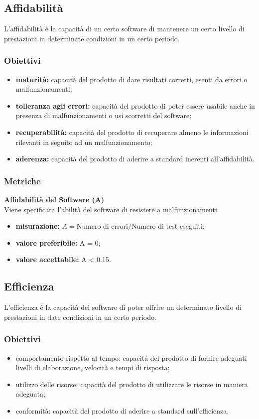 \subsection{Affidabilità}
L'affidabilità è la capacità di un certo software di mantenere un certo livello di prestazioni in determinate condizioni in un certo periodo.
\subsubsection{Obiettivi}
\begin{itemize}
	\item \textbf{maturità:} capacità del prodotto di dare risultati corretti, esenti da errori o malfunzionamenti;
	\item \textbf{tolleranza agli errori:} capacità del prodotto di poter essere usabile anche in presenza di malfunzionamenti o usi scorretti del software;
	\item \textbf{recuperabilità:} capacità del prodotto di recuperare almeno le informazioni rilevanti in seguito ad un malfunzionamento;
	\item \textbf{aderenza:} capacità del prodotto di aderire a standard inerenti all'affidabilità.
\end{itemize}
\subsubsection{Metriche}
\textbf{Affidabilità del Software (A)}\\
Viene specificata l'abilità del software di resistere a malfunzionamenti.
\begin{itemize}
	\item \textbf{misurazione:} $A = $Numero di errori$ / $Numero di test eseguiti;
	\item \textbf{valore preferibile:} A = 0;
	\item \textbf{valore accettabile:} A < 0.15.
\end{itemize}

\subsection{Efficienza}
L'efficienza è la capacità del software di poter offrire un determinato livello di prestazioni in date condizioni in un certo periodo.
\subsubsection{Obiettivi}
\begin{itemize}
	\item comportamento rispetto al tempo: capacità del prodotto di fornire adeguati livelli di elaborazione, velocità e tempi di risposta;
	\item utilizzo delle risorse: capacità del prodotto di utilizzare le risorse in maniera adeguata;
	\item conformità: capacità del prodotto di aderire a standard sull'efficienza.
\end{itemize}
